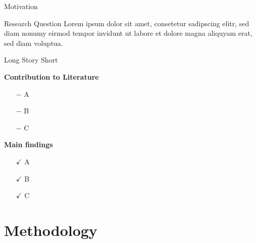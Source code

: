 \documentclass[compress, aspectratio=169, xcolor=dvipsnames]{beamer}
\begin{document}
\begin{frame}{Motivation}
\begin{block}{Research Question}
	Lorem ipsum dolor sit amet, consetetur sadipscing elitr, sed diam nonumy eirmod tempor invidunt ut labore et dolore magna aliquyam erat, sed diam voluptua.
\end{block}
	
\end{frame}

\begin{frame}{Long Story Short}

\textbf{Contribution to Literature} 
\begin{itemize}
	\item[$-$] A
	\item[$-$] B
	\item[$-$] C
\end{itemize}

\vspace{10pt}
\textbf{Main findings} 
\begin{itemize}
	\item[$\checkmark$] A
	\item[$\checkmark$] B
	\item[$\checkmark$] C
\end{itemize}
	
\end{frame}


\section{Methodology}
\end{document}
